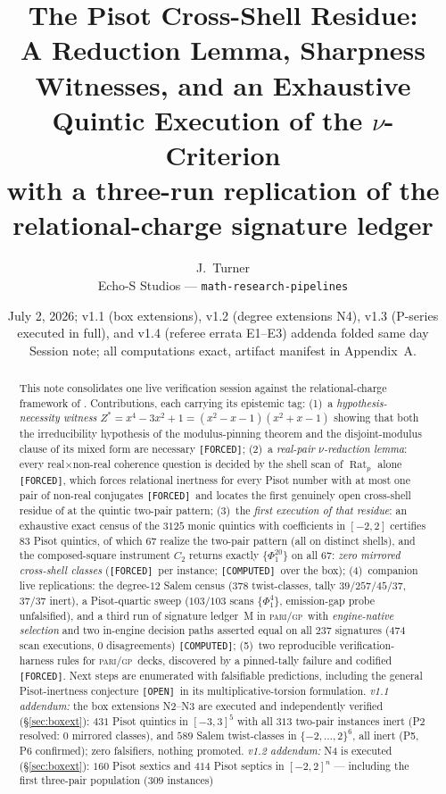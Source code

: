 \documentclass[11pt]{article}
\title{\textbf{The Pisot Cross-Shell Residue:}\\
A Reduction Lemma, Sharpness Witnesses, and an Exhaustive Quintic Execution of the $\nu$-Criterion\\
\large with a three-run replication of the relational-charge signature ledger}
\author{J.~Turner\\ \small Echo-S Studios --- \texttt{math-research-pipelines}}
\date{July 2, 2026; v1.1 (box extensions), v1.2 (degree extensions N4), v1.3 (P-series executed in full), and v1.4 (referee errata E1--E3) addenda folded same day \\ \small Session note; all computations exact, artifact manifest in Appendix~A.}
\newcommand{\F}{\textnormal{\texttt{[FORCED]}}}
\newcommand{\C}{\textnormal{\texttt{[COMPUTED]}}}
\newcommand{\Op}{\textnormal{\texttt{[OPEN]}}}
\newcommand{\Rat}{\operatorname{Rat}}
\newcommand{\gp}{\textsc{pari/gp}}
\theoremstyle{definition}
\begin{document}
\maketitle

\begin{abstract}
This note consolidates one live verification session against the relational-charge
framework of \cite{relcharge}. Contributions, each carrying its epistemic tag:
(1)~a \emph{hypothesis-necessity witness} $Z^{*}=x^4-3x^2+1=(x^2-x-1)(x^2+x-1)$
showing that both the irreducibility hypothesis of the modulus-pinning theorem and
the disjoint-modulus clause of its mixed form are necessary \F;
(2)~a \emph{real-pair $\nu$-reduction lemma}: every real$\times$non-real coherence
question is decided by the shell scan of $\Rat_p$ alone \F, which forces relational
inertness for every Pisot number with at most one pair of non-real conjugates \F\
and locates the first genuinely open cross-shell residue of \cite[Cor.~7.16]{relcharge}
at the quintic two-pair pattern;
(3)~the \emph{first execution of that residue}: an exhaustive exact census of the
$3125$ monic quintics with coefficients in $[-2,2]$ certifies $83$ Pisot quintics,
of which $67$ realize the two-pair pattern (all on distinct shells), and the
composed-square instrument $C_2$ returns exactly $\{\Phi_1^{20}\}$ on all $67$:
\emph{zero mirrored cross-shell classes} (\F\ per instance; \C\ over the box);
(4)~companion live replications: the degree-$12$ Salem census
($378$ twist-classes, tally $39/257/45/37$, $37/37$ inert), a Pisot-quartic sweep
($103/103$ scans $\{\Phi_1^4\}$, emission-gap probe unfalsified), and a third run
of signature ledger~M in \gp\ with \emph{engine-native selection} and two
in-engine decision paths asserted equal on all $237$ signatures ($474$ scan
executions, $0$ disagreements) \C;
(5)~two reproducible verification-harness rules for \gp\ decks, discovered by a
pinned-tally failure and codified \F.
Next steps are enumerated with falsifiable predictions, including the general
Pisot-inertness conjecture \Op\ in its multiplicative-torsion formulation.
\emph{v1.1 addendum:} the box extensions N2--N3 are executed and independently
verified (\S\ref{sec:boxext}): $431$ Pisot quintics in $[-3,3]^5$ with all
$313$ two-pair instances inert (P2 resolved: $0$ mirrored classes), and $589$
Salem twist-classes in $\{-2,\dots,2\}^6$, all inert (P5, P6 confirmed); zero
falsifiers, nothing promoted. \emph{v1.2 addendum:} N4 is executed
(\S\ref{sec:boxext}): $160$ Pisot sextics and $414$ Pisot septics in
$[-2,2]^n$ --- including the first three-pair population ($309$ instances)

\end{abstract}
\end{document}
